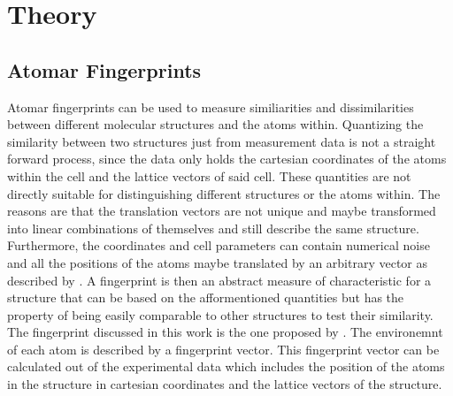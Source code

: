
\chapter{Theory} %

\label{Chapter1} %


\newcommand{\keyword}[1]{\textbf{#1}}
\newcommand{\tabhead}[1]{\textbf{#1}}
\newcommand{\code}[1]{\texttt{#1}}
\newcommand{\file}[1]{\texttt{\bfseries#1}}
\newcommand{\option}[1]{\texttt{\itshape#1}}


\section{Atomar Fingerprints}
Atomar fingerprints can be used to measure similiarities and dissimilarities between different molecular structures and the atoms within. Quantizing the similarity between two structures just from measurement data is not a straight forward process, since the data only holds the cartesian coordinates of the atoms within the cell and the lattice vectors of said cell. These  quantities are not directly suitable for distinguishing different structures or the atoms within. The reasons are that the translation vectors are not unique and maybe transformed into linear combinations of themselves and still describe the same structure. Furthermore, the coordinates and cell parameters can contain numerical noise and all the positions of the atoms maybe translated by an arbitrary vector as described by \citeauthor{Lonie2012} \cite{Lonie2012}. A fingerprint is then an abstract measure of characteristic for a structure that can be based on the afformentioned quantities but has the property of being easily comparable to other structures to test their similarity. The fingerprint discussed in this work is the one proposed by \citeauthor{Zhu2016} \cite{Zhu2016}. The environemnt of each atom is described by a fingerprint vector. This fingerprint vector can be calculated out of the experimental data which includes the position of the atoms in the structure in cartesian coordinates and the lattice vectors of the structure. \\
